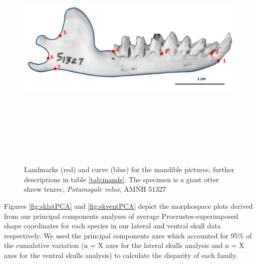 \documentclass[12pt,a4paper]{article}
\begin{document}
	\begin{figure}[H] 
 	\centering
  	\includegraphics[width=12cm, height=12cm, keepaspectratio=true]
  	{figures/AMNH_51327_landmarksdiagram.png}
    \caption {Landmarks (red) and curve (blue) for the mandible pictures, further descriptions in table \ref{tab:mands}. The specimen is a giant otter shrew tenrec, \textit{Potamogale velox}, AMNH 51327}
  	\label{fig:mands_landmarks}
  	\end{figure}

	\begin{table}[h]			
	\centering
	\caption{Descriptions of the landmarks (points) and curves (semilandmarks) for the mandibles in lateral (buccal) view (see figure \ref{fig:mands_landmarks})}
	
	\label{tab:mands} 
	\end{table}

Figures  \ref{fig:sklatPCA} and \ref{fig:skventPCA} depict the morphospace plots derived from our principal components analyses of average Procrustes-superimposed shape coordinates for each species in our lateral and ventral skull data respectively. We used the principal components axes which accounted for 95\% of the cumulative variation (n = X axes for the lateral skulls analysis and n = X axes for the ventral skulls analysis) to calculate the disparity of each family. 
\end{document}
